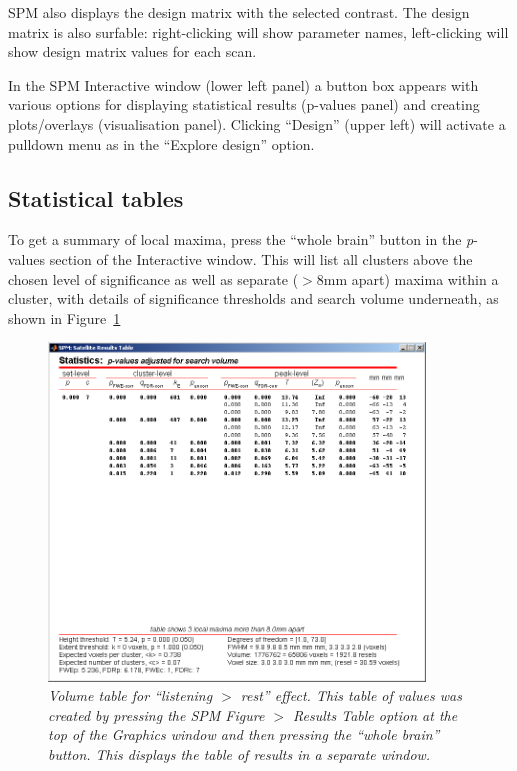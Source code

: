 SPM also displays the design matrix with the selected contrast. The design matrix is also surfable: right-clicking will show parameter names, left-clicking will show design matrix values for each scan. 

In the SPM Interactive window (lower left panel) a button box appears with various options for displaying statistical results (p-values panel) and creating plots/overlays (visualisation panel). Clicking ``Design'' (upper left) will activate a pulldown menu as in the ``Explore design'' option.

\subsection{Statistical tables}

To get a summary of local maxima, press the ``whole brain'' button in the \textit{p}-values section of the Interactive window. This will list all clusters above the chosen level of significance as well as separate ($>$8mm apart) maxima within a cluster, with details of significance thresholds and search volume underneath, as shown in Figure~\ref{aud_volume}

\begin{figure}
\begin{center}
\includegraphics[width=100mm]{auditory/volume}
\caption{\em Volume table for ``listening $>$ rest'' effect. This table of values was created by pressing the SPM Figure $>$ Results Table option at the top of the Graphics window and then pressing the ``whole brain'' button. This displays the table of results in a separate window. \label{aud_volume}}
\end{center}
\end{figure}

